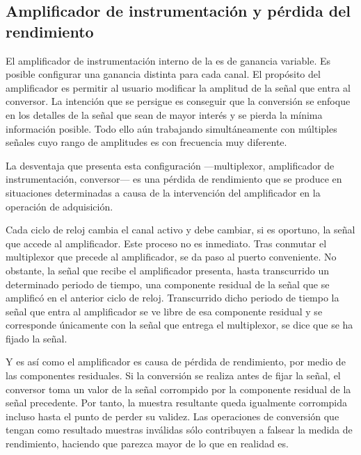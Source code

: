 \subsection[El amplificador de instrumentación]{Amplificador de instrumentación y pérdida del rendimiento}

El amplificador de instrumentación interno de la \kpci{} es de ganancia variable. Es posible configurar una ganancia distinta para cada canal. El propósito del amplificador es permitir al usuario modificar la amplitud de la señal que entra al conversor. La intención que se persigue es conseguir que la conversión se enfoque en los detalles de la señal que sean de mayor interés y se pierda la mínima información posible. Todo ello aún trabajando simultáneamente con múltiples señales cuyo rango de amplitudes es con frecuencia muy diferente.\par
La desventaja que presenta esta configuración ---multiplexor, amplificador de instrumentación, conversor--- es una pérdida de rendimiento que se produce en situaciones determinadas a causa de la intervención del amplificador en la operación de adquisición.\par
Cada ciclo de reloj cambia el canal activo y debe cambiar, si es oportuno, la señal que accede al amplificador. Este proceso no es inmediato. Tras conmutar el multiplexor que precede al amplificador, se da paso al puerto conveniente. No obstante, la señal que recibe el amplificador presenta, hasta transcurrido un determinado periodo de tiempo, una componente residual de la señal que se amplificó en el anterior ciclo de reloj. Transcurrido dicho periodo de tiempo la señal que entra al amplificador se ve libre de esa componente residual y se corresponde únicamente con la señal que entrega el multiplexor, se dice que se ha fijado la señal.\par
Y es así como el amplificador es causa de pérdida de rendimiento, por medio de las componentes residuales. Si la conversión se realiza antes de fijar la señal, el conversor toma un valor de la señal corrompido por la componente residual de la señal precedente. Por tanto, la muestra resultante queda igualmente corrompida incluso hasta el punto de perder su validez. Las operaciones de conversión que tengan como resultado muestras inválidas sólo contribuyen a falsear la medida de rendimiento, haciendo que parezca mayor de lo que en realidad es.\par
